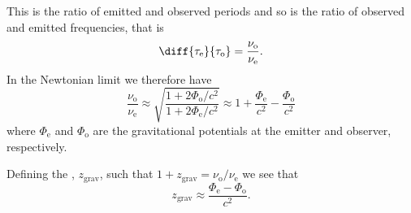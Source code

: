 \documentclass[fleqn]{NotesClass}
\begin{document}
    This is the ratio of emitted and observed periods and so is the ratio of observed and emitted frequencies, that is
    \begin{equation}
        \diff{\tau_{\mathrm{e}}}{\tau_{\mathrm{o}}} = \frac{\nu_{\mathrm{o}}}{\nu_{\mathrm{e}}}.
    \end{equation}
    In the Newtonian limit we therefore have
    \begin{equation}
        \frac{\nu_{\mathrm{o}}}{\nu_{\mathrm{e}}} \approx \sqrt{\frac{1 + 2\Phi_{\mathrm{o}}/c^2}{1 + 2\Phi_{\mathrm{e}}/c^2}} \approx 1 + \frac{\Phi_{\mathrm{e}}}{c^2} - \frac{\Phi_{\mathrm{o}}}{c^2}
    \end{equation}
    where \(\Phi_{\mathrm{e}}\) and \(\Phi_{\mathrm{o}}\) are the gravitational potentials at the emitter and observer, respectively.
    
    Defining the , \(z_{\mathrm{grav}}\), such that \(1 + z_{\mathrm{grav}} = \nu_{\mathrm{o}}/\nu_{\mathrm{e}}\) we see that
    \begin{equation}
        z_{\mathrm{grav}} \approx \frac{\Phi_{\mathrm{e}} - \Phi_{\mathrm{o}}}{c^2}.
    \end{equation}
    
%        
    
    \backmatter
    \renewcommand{\glossaryname}{Acronyms}
    \printglossary[acronym]
    \printindex
\end{document}
